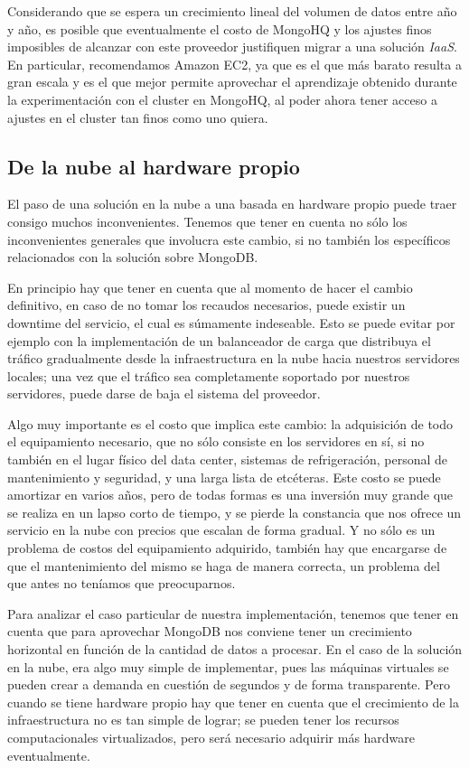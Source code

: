 \documentclass[a4paper,10pt,twoside]{article}
\begin{document}
Considerando que se espera un crecimiento lineal del volumen de datos entre año y año, es posible que eventualmente el costo de MongoHQ y los ajustes finos imposibles de alcanzar con este proveedor justifiquen migrar a una solución \emph{IaaS}. En particular, recomendamos Amazon EC2, ya que es el que más barato resulta a gran escala y es el que mejor permite aprovechar el aprendizaje obtenido durante la experimentación con el cluster en MongoHQ, al poder ahora tener acceso a ajustes en el cluster tan finos como uno quiera.


\subsection{De la nube al hardware propio}

El paso de una solución en la nube a una basada en hardware propio puede traer consigo muchos inconvenientes. Tenemos que tener en cuenta no sólo los inconvenientes generales que involucra este cambio, si no también los específicos relacionados con la solución sobre MongoDB.

En principio hay que tener en cuenta que al momento de hacer el cambio definitivo, en caso de no tomar los recaudos necesarios, puede existir un downtime del servicio, el cual es súmamente indeseable. Esto se puede evitar por ejemplo con la implementación de un balanceador de carga que distribuya el tráfico gradualmente desde la infraestructura en la nube hacia nuestros servidores locales; una vez que el tráfico sea completamente soportado por nuestros servidores, puede darse de baja el sistema del proveedor.

Algo muy importante es el costo que implica este cambio: la adquisición de todo el equipamiento necesario, que no sólo consiste en los servidores en sí, si no también en el lugar físico del data center, sistemas de refrigeración, personal de mantenimiento y seguridad, y una larga lista de etcéteras. Este costo se puede amortizar en varios años, pero de todas formas es una inversión muy grande que se realiza en un lapso corto de tiempo, y se pierde la constancia que nos ofrece un servicio en la nube con precios que escalan de forma gradual. Y no sólo es un problema de costos del equipamiento adquirido, también hay que encargarse de que el mantenimiento del mismo se haga de manera correcta, un problema del que antes no teníamos que preocuparnos.

Para analizar el caso particular de nuestra implementación, tenemos que tener en cuenta que para aprovechar MongoDB nos conviene tener un crecimiento horizontal en función de la cantidad de datos a procesar. En el caso de la solución en la nube, era algo muy simple de implementar, pues las máquinas virtuales se pueden crear a demanda en cuestión de segundos y de forma transparente. Pero cuando se tiene hardware propio hay que tener en cuenta que el crecimiento de la infraestructura no es tan simple de lograr; se pueden tener los recursos computacionales virtualizados, pero será necesario adquirir más hardware eventualmente.
\end{document}
